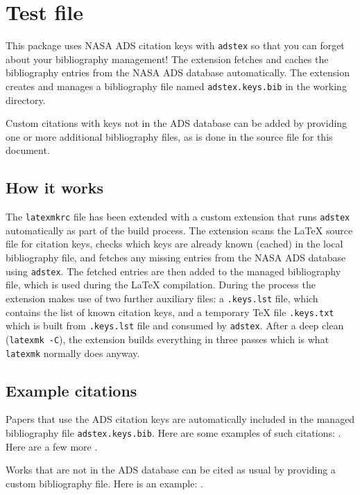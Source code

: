 \documentclass{article}
\begin{document}
\section*{Test file}

This package uses NASA ADS citation keys with \texttt{adstex} so that you can forget about your bibliography management! The extension fetches and caches the bibliography entries from the NASA ADS database automatically. The extension creates and manages a bibliography file named \texttt{adstex.keys.bib} in the working directory. 

Custom citations with keys not in the ADS database can be added by providing one or more additional bibliography files, as is done in the source file for this document.

\subsection*{How it works}
The \texttt{latexmkrc} file has been extended with a custom extension that runs \texttt{adstex} automatically as part of the build process. The extension scans the LaTeX source file for citation keys, checks which keys are already known (cached) in the local bibliography file, and fetches any missing entries from the NASA ADS database using \texttt{adstex}. The fetched entries are then added to the managed bibliography file, which is used during the LaTeX compilation. During the process the extension makes use of two further auxiliary files: a \texttt{.keys.lst} file, which contains the list of known citation keys, and a temporary TeX file \texttt{.keys.txt} which is built from \texttt{.keys.lst} file and consumed by \texttt{adstex}. After a deep clean (\texttt{latexmk -C}), the extension builds everything in three passes which is what \texttt{latexmk} normally does anyway. 

\subsection*{Example citations}
Papers that use the ADS citation keys are automatically included in the managed bibliography file \texttt{adstex.keys.bib}.
Here are some examples of such citations:
\cite{%
    1958ZA.....46..108B,%
    1962AJ.....67..471K,%
    1966AJ.....71...64K%
}. 
Here are a few more
\cite{2002Sci...295...82K,2003PASP..115..763C}. 

Works that are not in the ADS database can be cited as usual by providing a custom bibliography file. Here is an example: \cite{mcgrail2004}.




\end{document}
